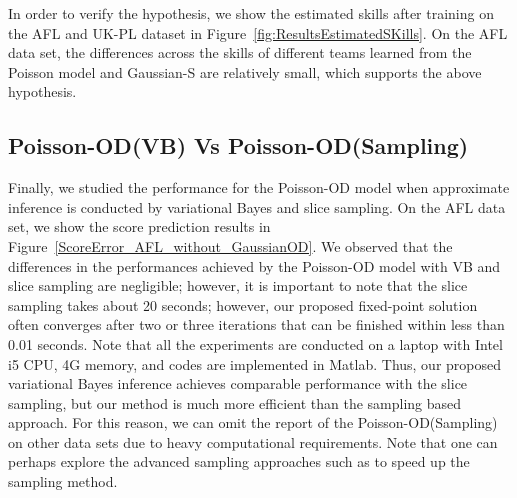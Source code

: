 In order to verify the hypothesis, we show the estimated skills after
training on the AFL and UK-PL dataset in
Figure~\ref{fig:ResultsEstimatedSKills}. On the AFL data set, the
differences across the skills of different teams learned from the
Poisson model and Gaussian-S are relatively small, which supports the
above hypothesis.

\ENDCOMMENT

\subsection{Poisson-OD(VB) Vs Poisson-OD(Sampling)}
\label{sec:VBSampling}
Finally, we studied the performance for the Poisson-OD model when approximate inference is conducted by variational Bayes and slice sampling. On the AFL data set, we show the score prediction results in Figure~\ref{ScoreError_AFL_without_GaussianOD}. We observed that the differences in the performances achieved by the Poisson-OD model with VB and slice sampling are negligible; however, it is important to note that the slice sampling takes about 20 seconds; however, our proposed fixed-point solution often converges after two or three iterations that can be finished within less than 0.01 seconds. Note that all the experiments are conducted on a laptop with Intel i5 CPU, 4G memory, and codes are implemented in Matlab. Thus, our proposed variational Bayes inference achieves comparable performance with the slice sampling, but our method is much more efficient than the sampling based approach. For this reason, we can omit the report of the Poisson-OD(Sampling) on other data sets due to heavy computational requirements. Note that one can perhaps explore the advanced sampling approaches such as \cite{Murray:AISTATS2010} to speed up the sampling method. 


